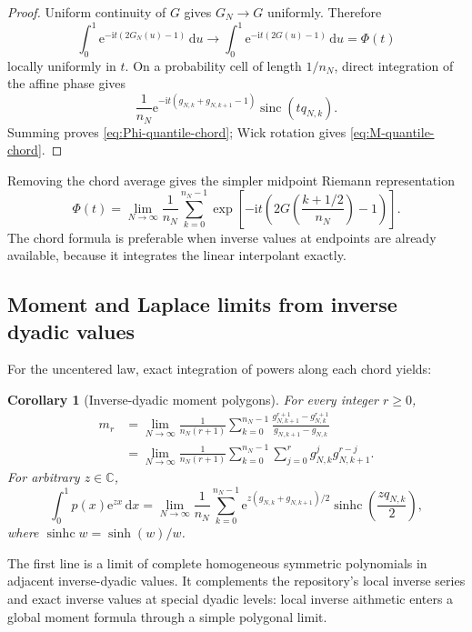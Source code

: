 \documentclass[11pt,oneside]{article}
\newtheorem{corollary}[theorem]{Corollary}
\theoremstyle{definition}
\theoremstyle{remark}
\newcommand{\C}{\mathbb C}
\newcommand{\sinc}{\operatorname{sinc}}
\newcommand{\sinhc}{\operatorname{sinhc}}
\newcommand{\e}{\mathrm e}
\newcommand{\ii}{\mathrm i}
\newcommand{\dd}{\,\mathrm d}
\begin{document}
\begin{proof}
Uniform continuity of $G$ gives $G_N\to G$ uniformly.  Therefore
\[
 \int_0^1\e^{-\ii t(2G_N(u)-1)}\dd u
 \longrightarrow
 \int_0^1\e^{-\ii t(2G(u)-1)}\dd u=\Phi(t)
\]
locally uniformly in $t$.  On a probability cell of length $1/n_N$, direct
integration of the affine phase gives
\[
 \frac1{n_N}\e^{-\ii t(g_{N,k}+g_{N,k+1}-1)}
 \sinc(tq_{N,k}).
\]
Summing proves \eqref{eq:Phi-quantile-chord}; Wick rotation gives
\eqref{eq:M-quantile-chord}.
\end{proof}

Removing the chord average gives the simpler midpoint Riemann representation
\begin{equation}\label{eq:Phi-quantile-midpoint}
 \Phi(t)=\lim_{N\to\infty}\frac1{n_N}
 \sum_{k=0}^{n_N-1}
 \exp\!\left[-\ii t\left(2G\!\left(\frac{k+1/2}{n_N}\right)-1\right)\right].
\end{equation}
The chord formula is preferable when inverse values at endpoints are already
available, because it integrates the linear interpolant exactly.

\subsection{Moment and Laplace limits from inverse dyadic values}

For the uncentered law, exact integration of powers along each chord yields:

\begin{corollary}[Inverse-dyadic moment polygons]
\label{cor:inverse-moment-polygons}
For every integer $r\ge0$,
\begin{align}
 m_r
 &=\lim_{N\to\infty}\frac1{n_N(r+1)}
 \sum_{k=0}^{n_N-1}
 \frac{g_{N,k+1}^{r+1}-g_{N,k}^{r+1}}
      {g_{N,k+1}-g_{N,k}}
 \label{eq:moment-quantile-chord}\\
 &=\lim_{N\to\infty}\frac1{n_N(r+1)}
 \sum_{k=0}^{n_N-1}\sum_{j=0}^r
 g_{N,k}^{j}g_{N,k+1}^{r-j}.
 \label{eq:moment-quantile-homogeneous}
\end{align}
For arbitrary $z\in\C$,
\begin{equation}\label{eq:p-MGF-quantile-chord}
 \int_0^1p(x)\e^{zx}\dd x
 =\lim_{N\to\infty}\frac1{n_N}
 \sum_{k=0}^{n_N-1}
 \e^{z(g_{N,k}+g_{N,k+1})/2}
 \sinhc\!\left(\frac{zq_{N,k}}2\right),
\end{equation}
where $\sinhc w=\sinh(w)/w$.
\end{corollary}

The first line is a limit of complete homogeneous symmetric polynomials in
adjacent inverse-dyadic values.  It complements the repository's local inverse
series and exact inverse values at special dyadic levels: local inverse
aithmetic enters a global moment formula through a simple polygonal limit.
\end{document}

